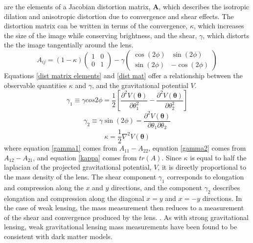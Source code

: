 \documentclass[a4paper,12pt]{article}
\begin{document}
are the elements of a Jacobian distortion matrix, $\mathbf{A}$, which describes the isotropic dilation and anisotropic distortion due to convergence and shear effects.  The distortion matrix can be written in terms of the convergence, $\kappa$, which increases the size of the image while conserving brightness, and the shear, $\gamma$, which distorts the the image tangentially around the lens.  
\begin{equation} \label{dist mat}
A_{ij}=(1-\kappa) \left(\begin{matrix} 1 & 0 \\ 0 & 1 \end{matrix} \right) - \gamma \left(\begin{matrix} \cos(2\phi) & \sin(2\phi) \\ \sin(2\phi) & -\cos(2\phi) \end{matrix} \right) 
\end{equation}
Equations \ref{dist matrix elements} and \ref{dist mat} offer a relationship between the observable quantities $\kappa$ and $\gamma$, and the gravitational potential $V$.
\begin{equation} \label{gamma1}
\gamma_1 \equiv \gamma cos 2\phi= \frac{1}{2} \left[\frac{ \partial ^2 V(\boldsymbol{\theta})}{\partial \theta_1^2} - \frac{ \partial^2 V(\boldsymbol{\theta})}{\partial \theta_2^2} \right]
\end{equation}
\begin{equation} \label{gamma2}
\gamma_2 \equiv \gamma \sin (2\phi) = \frac{ \partial^2 V(\boldsymbol{\theta})}{\partial \theta_1 \partial \theta_2}
\end{equation}
\begin{equation} \label{kappa}
\kappa = \frac{1}{2} \nabla^2 V(\boldsymbol{\theta})
\end{equation}
where equation \ref{gamma1} comes from $A_{11}-A_{22}$, equation \ref{gamma2} comes from $A_{12}-A_{21}$, and equation \ref{kappa} comes from $tr(A)$.  Since $\kappa$ is equal to half the laplacian of the projected gravitational potential, $V$, it is directly proportional to the mass density of the lens.  The shear component $\gamma_1$ corresponds to elongation and compression along the $x$ and $y$ directions, and the component $\gamma_2$ describes elongation and compression along the diagonal $x=y$ and $x=-y$ directions.  In the case of weak lensing, the mass measurement then reduces to a measurement of the shear and convergence produced by the lens. \cite{Pires}. As with strong gravitational lensing, weak gravitational lensing mass measurements have been found to be consistent with dark matter models. \cite{Wu}
\end{document}
